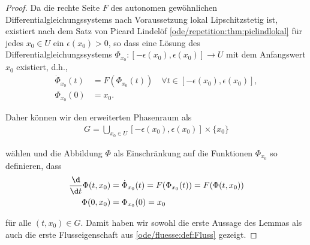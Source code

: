 \documentclass[letterpaper,10pt,german]{jupyterBook}
\begin{document}
\begin{proof}
 Da die rechte Seite \(F\) des autonomen gewöhnlichen Differentialgleichungssystems nach Voraussetzung lokal Lipschitzstetig ist, existiert nach dem Satz von Picard Lindelöf \cref{ode/repetition:thm:piclindlokal} für jedes \(x_0\in U\) ein \(\epsilon(x_0)>0\), so dass eine Lösung des Differentialgleichungssystems \(\Phi_{x_0} \colon [-\epsilon(x_0),\epsilon(x_0)] \rightarrow U\) mit dem Anfangswert \(x_0\) existiert, d.h.,
\begin{align*}
\dot{\Phi}_{x_0}(t) &= F(\Phi_{x_0}(t)) \quad \forall t \in [-\epsilon(x_0),\epsilon(x_0)],\\
\Phi_{x_0}(0) &= x_0.
\end{align*}
\par
Daher können wir den erweiterten Phasenraum als
\begin{align*}
G = \bigcup_{x_0\in U} [-\epsilon(x_0),\epsilon(x_0)] \times\{x_0\}
\end{align*}
\par
wählen und die Abbildung \(\Phi\) als Einschränkung auf die Funktionen \(\Phi_{x_0}\) so definieren, dass
\begin{align*}
\frac{\d}{\d t} \Phi(t, x_0) &= \dot{\Phi}_{x_0}(t) = F(\Phi_{x_0}(t)) = F(\Phi(t, x_0))\\
\Phi(0, x_0) &= \Phi_{x_0}(0) = x_0
\end{align*}
\par
für alle \((t, x_0)\in G\).
Damit haben wir sowohl die erste Aussage des Lemmas als auch die erste Flusseigenschaft aus \cref{ode/fluesse:def:Fluss} gezeigt.


\end{proof}
\end{document}
